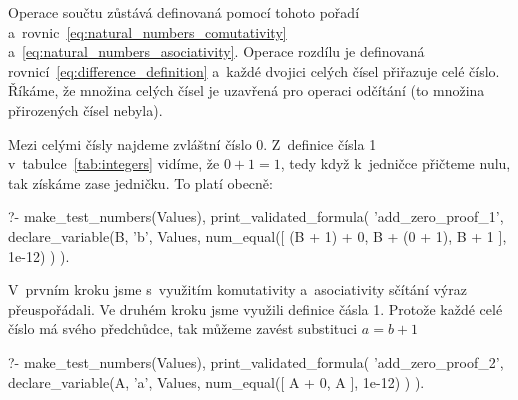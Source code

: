 Operace součtu zůstává definovaná pomocí tohoto pořadí a~rovnic~\eqref{eq:natural_numbers_comutativity} a~\eqref{eq:natural_numbers_asociativity}. Operace rozdílu je definovaná rovnicí~\ref{eq:difference_definition} a~každé dvojici celých čísel přiřazuje celé číslo. Říkáme, že množina celých čísel je uzavřená pro operaci odčítání (to množina přirozených čísel nebyla).


Mezi celými čísly najdeme zvláštní číslo 0. Z~definice čísla 1 v~tabulce~\ref{tab:integers} vidíme, že \(0 + 1 = 1\), tedy když k~jedničce přičteme nulu, tak získáme zase jedničku. To platí obecně:

\begin{prolog}
?-	make_test_numbers(Values),
	print_validated_formula(
		'add_zero_proof_1',
		declare_variable(B, 'b', Values,
			num_equal([
				(B + 1) + 0,
				B + (0 + 1),
				B + 1
			], 1e-12)
		)
	).
\end{prolog}

V~prvním kroku jsme s~využitím komutativity a~asociativity sčítání výraz přeuspořádali. Ve druhém kroku jsme využili definice čásla 1. Protože každé celé číslo má svého předchůdce, tak můžeme zavést substituci \(a = b + 1\)

\begin{prolog}
?-	make_test_numbers(Values),
	print_validated_formula(
		'add_zero_proof_2',
		declare_variable(A, 'a', Values,
			num_equal([
				A + 0,
				A
			], 1e-12)
		)
	).
\end{prolog}
